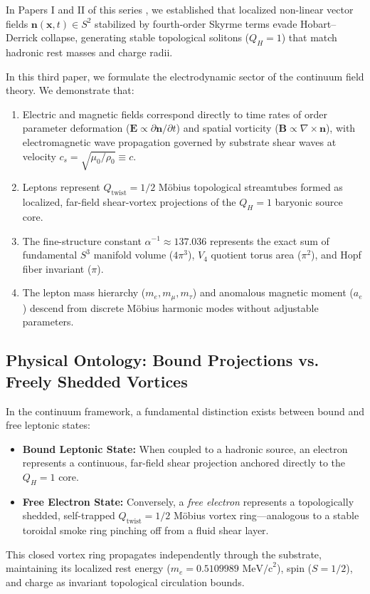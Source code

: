 \documentclass[11pt,a4paper]{article}
\begin{document}
	In Papers I and II of this series \cite{PaperI, PaperII}, we established that localized non-linear vector fields $\mathbf{n}(\mathbf{x}, t) \in S^2$ stabilized by fourth-order Skyrme terms evade Hobart--Derrick collapse, generating stable topological solitons ($Q_H = 1$) that match hadronic rest masses and charge radii.
	
	In this third paper, we formulate the electrodynamic sector of the continuum field theory. We demonstrate that:
	\begin{enumerate}
		\item Electric and magnetic fields correspond directly to time rates of order parameter deformation ($\mathbf{E} \propto \partial \mathbf{n}/\partial t$) and spatial vorticity ($\mathbf{B} \propto \nabla \times \mathbf{n}$), with electromagnetic wave propagation governed by substrate shear waves at velocity $c_s = \sqrt{\mu_0/\rho_0} \equiv c$.
		\item Leptons represent $Q_{\text{twist}} = 1/2$ Möbius topological streamtubes formed as localized, far-field shear-vortex projections of the $Q_H = 1$ baryonic source core.
		\item The fine-structure constant $\alpha^{-1} \approx 137.036$ represents the exact sum of fundamental $S^3$ manifold volume ($4\pi^3$), $V_4$ quotient torus area ($\pi^2$), and Hopf fiber invariant ($\pi$).
		\item The lepton mass hierarchy ($m_e, m_\mu, m_\tau$) and anomalous magnetic moment ($a_e$) descend from discrete Möbius harmonic modes without adjustable parameters.
	\end{enumerate}
	
	\subsection{Physical Ontology: Bound Projections vs. Freely Shedded Vortices}
	In the continuum framework, a fundamental distinction exists between bound and free leptonic states:
	\begin{itemize}
		\item \textbf{Bound Leptonic State:} When coupled to a hadronic source, an electron represents a continuous, far-field shear projection anchored directly to the $Q_H = 1$ core.
		\item \textbf{Free Electron State:} Conversely, a \textit{free electron} represents a topologically shedded, self-trapped $Q_{\text{twist}} = 1/2$ Möbius vortex ring—analogous to a stable toroidal smoke ring pinching off from a fluid shear layer.
	\end{itemize}
	This closed vortex ring propagates independently through the substrate, maintaining its localized rest energy ($m_e = 0.5109989 \text{ MeV/c}^2$), spin ($S = 1/2$), and charge as invariant topological circulation bounds.
	
\end{document}
